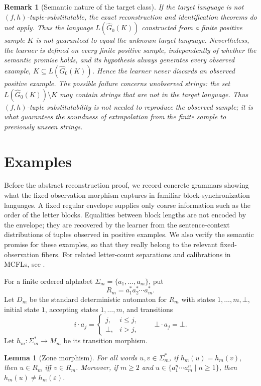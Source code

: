 \documentclass[11pt,a4paper]{article}
\newtheorem{lemma}[theorem]{Lemma}
\newtheorem{remark}[theorem]{Remark}
\theoremstyle{remark}
\newcommand{\eps}{\varepsilon}
\begin{document}
\begin{remark}[Semantic nature of the target class]
If the target language is not \((f,h)\)-tuple-substitutable, the exact
reconstruction and identification theorems do not apply.  Thus the language \(L(\widehat G_0(K))\) constructed from a finite positive
sample \(K\) is not guaranteed to equal the
unknown target language.  Nevertheless, the learner is defined on every finite
positive sample, independently of whether the semantic promise holds, and its
hypothesis always generates every observed example,
\(K\subseteq L(\widehat G_0(K))\).  Hence the learner never discards an observed positive example.  The possible
failure concerns unobserved strings: the set
\(L(\widehat G_0(K))\setminus K\) may contain strings that are not in the target language.  Thus
\((f,h)\)-tuple substitutability is not needed to reproduce the observed
sample; it is what guarantees the soundness of extrapolation from the finite
sample to previously unseen strings.
\end{remark}


\section{Examples}
\label{sec:running-examples}

Before the abstract reconstruction proof, we record concrete grammars showing
what the fixed observation morphism captures in familiar block-synchronization
languages.  A fixed regular envelope supplies only coarse information such as
the order of the letter blocks.  Equalities between block lengths are not
encoded by the envelope; they are recovered by the learner from the
sentence-context distributions of tuples observed in positive examples.  We
also verify the semantic promise for these examples, so that they really belong
to the relevant fixed-observation fibers.  For related letter-count separations
and calibrations in MCFLs, see \cite{LehnerLindorfer2020}.

For a finite ordered alphabet \(\Sigma_m=\{a_1,\ldots,a_m\}\), put
\[
  R_m=a_1^*a_2^*\cdots a_m^* .
\]
Let \(D_m\) be the standard deterministic automaton for \(R_m\) with states
\(1,\ldots,m,\bot\), initial state \(1\), accepting states \(1,\ldots,m\), and
transitions
\[
  i\cdot a_j=
  \begin{cases}
    j, & i\le j,\\
    \bot, & i>j,
  \end{cases}
  \qquad
  \bot\cdot a_j=\bot .
\]
Let \(h_m:\Sigma_m^*\to M_m\) be its transition morphism.

\begin{lemma}[Zone morphism]
\label{lem:zone-morphism-basic}
For all words \(u,v\in\Sigma_m^*\), if \(h_m(u)=h_m(v)\), then
\(u\in R_m\) iff \(v\in R_m\).  Moreover, if \(m\ge2\) and
\(u\in \{a_1^n\cdots a_m^n\mid n\ge1\}\), then
\(h_m(u)\ne h_m(\eps)\).
\end{lemma}
\end{document}
